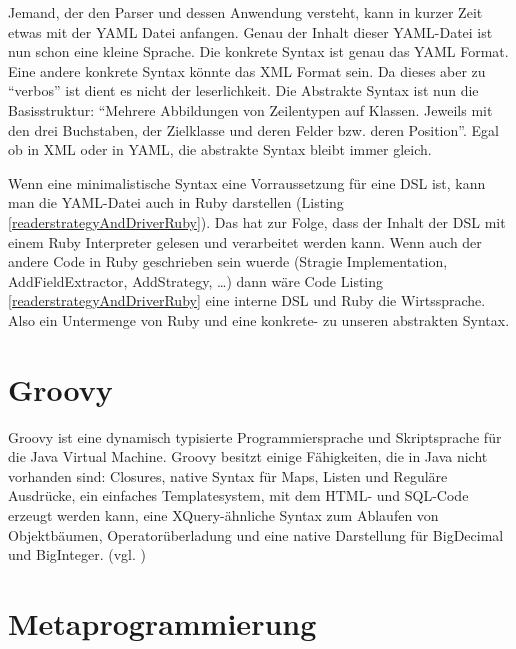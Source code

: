 \documentclass[11pt,english,ngerman, headsepline]{scrreprt}
\begin{document}
Jemand, der den Parser und dessen Anwendung versteht, kann in kurzer Zeit etwas
mit der YAML Datei anfangen. Genau der Inhalt dieser YAML-Datei ist nun schon
eine kleine Sprache. Die konkrete Syntax ist genau das YAML Format. Eine andere
konkrete Syntax könnte das XML Format sein. Da dieses aber zu ``verbos'' ist
dient es nicht der leserlichkeit. Die Abstrakte Syntax ist nun die
Basisstruktur: ``Mehrere Abbildungen von Zeilentypen auf Klassen. Jeweils mit
den drei Buchstaben, der Zielklasse und deren Felder bzw. deren Position''.
Egal ob in XML oder in YAML, die abstrakte Syntax bleibt immer gleich.

Wenn eine minimalistische Syntax eine Vorraussetzung für eine DSL ist, kann man
die YAML-Datei auch in Ruby darstellen (Listing
\ref{readerstrategyAndDriverRuby}). Das hat zur Folge, dass der Inhalt der DSL
mit einem Ruby Interpreter gelesen und verarbeitet werden kann. Wenn auch der andere Code in Ruby geschrieben sein wuerde (Stragie
Implementation, AddFieldExtractor, AddStrategy, \ldots) dann wäre Code Listing
\ref{readerstrategyAndDriverRuby} eine interne DSL und Ruby die Wirtssprache.
Also ein Untermenge von Ruby und eine konkrete- zu unseren abstrakten
Syntax.




\section{Groovy}

Groovy ist eine dynamisch typisierte Programmiersprache und Skriptsprache für
die Java Virtual Machine.
Groovy besitzt einige Fähigkeiten, die in Java nicht vorhanden sind: Closures,
native Syntax für Maps, Listen und Reguläre Ausdrücke, ein einfaches
Templatesystem, mit dem HTML- und SQL-Code erzeugt werden kann, eine
XQuery-ähnliche Syntax zum Ablaufen von Objektbäumen, Operatorüberladung und
eine native Darstellung für BigDecimal und BigInteger. (vgl. \cite{wikigroovy})



\section{Metaprogrammierung}\label{metaprogrammingLabel}
\end{document}
